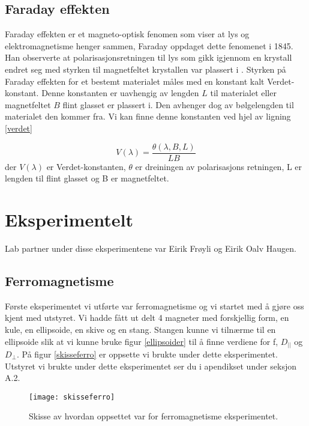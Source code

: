 \documentclass[norsk,a4paper,12pt]{article}
\begin{document}
\subsection{Faraday effekten}
Faraday effekten er et magneto-optisk fenomen som viser at lys og elektromagnetisme henger sammen, Faraday oppdaget dette fenomenet i 1845. Han observerte at polarisasjonsretningen til lys som gikk igjennom en krystall endret seg med styrken til magnetfeltet krystallen var plassert i \cite{opg}.
Styrken på Faraday effekten for et bestemt materialet måles med en konstant kalt Verdet-konstant. Denne konstanten er uavhengig av lengden $L$ til materialet eller magnetfeltet $B$ flint glasset er plassert i. Den avhenger dog av bølgelengden til materialet den kommer fra. Vi kan finne denne konstanten ved hjel av ligning \vref{verdet}

\begin{equation}
V(\lambda) = \frac{\theta(\lambda,B,L)}{LB}
\label{verdet}
\end{equation}
der $V(\lambda)$ er Verdet-konstanten, $\theta$ er dreiningen av polarisasjons retningen, L er lengden til flint glasset og B er magnetfeltet. 



\newpage
\section{Eksperimentelt}
Lab partner under disse eksperimentene var Eirik Frøyli og Eirik Oalv Haugen.

\subsection{Ferromagnetisme}
Første eksperimentet vi utførte var ferromagnetisme og vi startet med å gjøre oss kjent med utstyret. Vi hadde fått ut delt 4 magneter med forskjellig form, en kule, en ellipsoide, en skive og en stang. Stangen kunne vi tilnærme til en ellipsoide slik at vi kunne bruke figur \vref{ellipsoider} til å finne verdiene for f, $D_{||}$ og $D_\bot$. På figur \vref{skisseferro} er oppsette vi brukte under dette eksperimentet. Utstyret vi brukte under dette eksperimentet ser du i apendikset under seksjon A.2.

 \begin{figure}[h!]
	\begin{center}
  	\texttt{[image: skisseferro]}\\
	\caption[Oppsett til ferromagnetisme]{Skisse av hvordan oppsettet var for ferromagnetisme eksperimentet.}
	\label{skisseferro}
	\end{center}
\end{figure}
\end{document}
